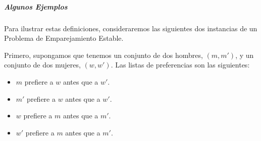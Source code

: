 \documentclass[a4paper, 12pt]{book}
\theoremstyle{dotless}
\begin{document}

\subparagraph{Algunos Ejemplos} Para ilustrar estas definiciones, consideraremos las siguientes dos instancias de un Problema de Emparejamiento Estable.

Primero, supongamos que tenemos un conjunto de dos hombres, $(m,m')$, y un conjunto de dos mujeres, $(w, w')$.  Las listas de preferencias son las siguientes:

   \begin{itemize}
      \item $m$ prefiere a $w$ antes que a $w'$.
      \item $m'$ prefiere a $w$ antes que a $w'$.
      \item $w$ prefiere a $m$ antes que a $m'$.
      \item $w'$ prefiere a $m$ antes que a $m'$.
    \end{itemize}
    
\end{document}
